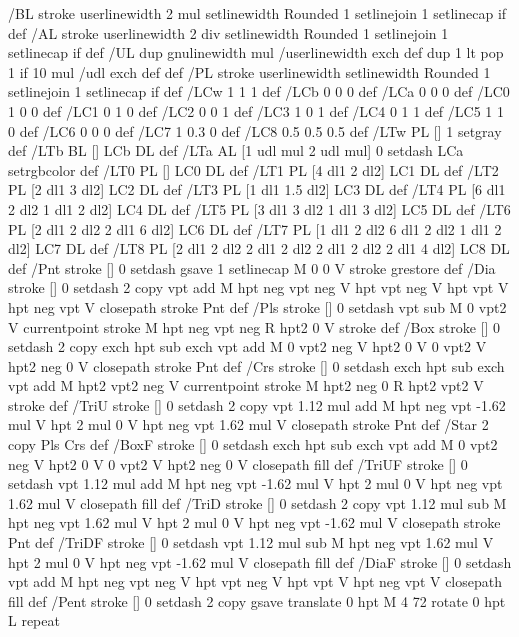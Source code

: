 {{{/BL {stroke userlinewidth 2 mul setlinewidth
	Rounded {1 setlinejoin 1 setlinecap} if} def
/AL {stroke userlinewidth 2 div setlinewidth
	Rounded {1 setlinejoin 1 setlinecap} if} def
/UL {dup gnulinewidth mul /userlinewidth exch def
	dup 1 lt {pop 1} if 10 mul /udl exch def} def
/PL {stroke userlinewidth setlinewidth
	Rounded {1 setlinejoin 1 setlinecap} if} def
/LCw {1 1 1} def
/LCb {0 0 0} def
/LCa {0 0 0} def
/LC0 {1 0 0} def
/LC1 {0 1 0} def
/LC2 {0 0 1} def
/LC3 {1 0 1} def
/LC4 {0 1 1} def
/LC5 {1 1 0} def
/LC6 {0 0 0} def
/LC7 {1 0.3 0} def
/LC8 {0.5 0.5 0.5} def
/LTw {PL [] 1 setgray} def
/LTb {BL [] LCb DL} def
/LTa {AL [1 udl mul 2 udl mul] 0 setdash LCa setrgbcolor} def
/LT0 {PL [] LC0 DL} def
/LT1 {PL [4 dl1 2 dl2] LC1 DL} def
/LT2 {PL [2 dl1 3 dl2] LC2 DL} def
/LT3 {PL [1 dl1 1.5 dl2] LC3 DL} def
/LT4 {PL [6 dl1 2 dl2 1 dl1 2 dl2] LC4 DL} def
/LT5 {PL [3 dl1 3 dl2 1 dl1 3 dl2] LC5 DL} def
/LT6 {PL [2 dl1 2 dl2 2 dl1 6 dl2] LC6 DL} def
/LT7 {PL [1 dl1 2 dl2 6 dl1 2 dl2 1 dl1 2 dl2] LC7 DL} def
/LT8 {PL [2 dl1 2 dl2 2 dl1 2 dl2 2 dl1 2 dl2 2 dl1 4 dl2] LC8 DL} def
/Pnt {stroke [] 0 setdash gsave 1 setlinecap M 0 0 V stroke grestore} def
/Dia {stroke [] 0 setdash 2 copy vpt add M
  hpt neg vpt neg V hpt vpt neg V
  hpt vpt V hpt neg vpt V closepath stroke
  Pnt} def
/Pls {stroke [] 0 setdash vpt sub M 0 vpt2 V
  currentpoint stroke M
  hpt neg vpt neg R hpt2 0 V stroke
 } def
/Box {stroke [] 0 setdash 2 copy exch hpt sub exch vpt add M
  0 vpt2 neg V hpt2 0 V 0 vpt2 V
  hpt2 neg 0 V closepath stroke
  Pnt} def
/Crs {stroke [] 0 setdash exch hpt sub exch vpt add M
  hpt2 vpt2 neg V currentpoint stroke M
  hpt2 neg 0 R hpt2 vpt2 V stroke} def
/TriU {stroke [] 0 setdash 2 copy vpt 1.12 mul add M
  hpt neg vpt -1.62 mul V
  hpt 2 mul 0 V
  hpt neg vpt 1.62 mul V closepath stroke
  Pnt} def
/Star {2 copy Pls Crs} def
/BoxF {stroke [] 0 setdash exch hpt sub exch vpt add M
  0 vpt2 neg V hpt2 0 V 0 vpt2 V
  hpt2 neg 0 V closepath fill} def
/TriUF {stroke [] 0 setdash vpt 1.12 mul add M
  hpt neg vpt -1.62 mul V
  hpt 2 mul 0 V
  hpt neg vpt 1.62 mul V closepath fill} def
/TriD {stroke [] 0 setdash 2 copy vpt 1.12 mul sub M
  hpt neg vpt 1.62 mul V
  hpt 2 mul 0 V
  hpt neg vpt -1.62 mul V closepath stroke
  Pnt} def
/TriDF {stroke [] 0 setdash vpt 1.12 mul sub M
  hpt neg vpt 1.62 mul V
  hpt 2 mul 0 V
  hpt neg vpt -1.62 mul V closepath fill} def
/DiaF {stroke [] 0 setdash vpt add M
  hpt neg vpt neg V hpt vpt neg V
  hpt vpt V hpt neg vpt V closepath fill} def
/Pent {stroke [] 0 setdash 2 copy gsave
  translate 0 hpt M 4 {72 rotate 0 hpt L} repeat
}}}}
